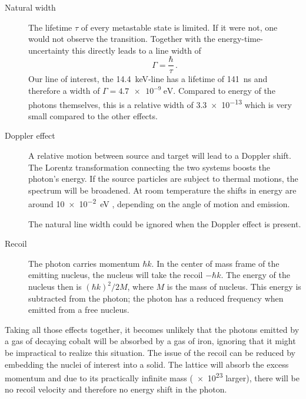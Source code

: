 \documentclass[11pt, english, fleqn, DIV=15, headinclude, BCOR=2cm]{scrreprt}
\begin{document}
\begin{description}
    \item[Natural width]
        The lifetime $\tau$ of every metastable state is limited. If it were
        not, one would not observe the transition. Together with the
        energy-time-uncertainty this directly leads to a line width of
        \[
            \Gamma = \frac\hbar\tau \,.
        \]
        Our line of interest, the \SI{14.4}{\kilo\electronvolt}-line has a
        lifetime of \SI{141}{\nano\second} and therefore a width of $\Gamma =
        \SI{4.7e-9}{\electronvolt}$. Compared to energy of the photons
        themselves, this is a relative width of \num{3.3e-13} which is very
        small compared to the other effects.
        \parencite[42]{Schatz/Nukleare_Festkoerperphysik}

    \item[Doppler effect]
        A relative motion between source and target will lead to a Doppler
        shift. The Lorentz transformation connecting the two systems boosts the
        photon's energy. If the source particles are subject to thermal
        motions, the spectrum will be broadened. At room temperature the shifts
        in energy are around \SI{10e-2}{\electronvolt}
        \parencite[43]{Schatz/Nukleare_Festkoerperphysik}, depending on the
        angle of motion and emission.

        The natural line width could be ignored when the Doppler effect is
        present.

    \item[Recoil]
        The photon carries momentum $\hbar k$. In the center of mass frame of
        the emitting nucleus, the nucleus will take the recoil $- \hbar k$. The
        energy of the nucleus then is $(\hbar k)^2/2 M$, where $M$ is the mass
        of nucleus. This energy is subtracted from the photon; the photon has a
        reduced frequency when emitted from a free nucleus.
\end{description}

Taking all those effects together, it becomes unlikely that the photons emitted
by a gas of decaying cobalt will be absorbed by a gas of iron, ignoring that it
might be impractical to realize this situation. The issue of the recoil can be
reduced by embedding the nuclei of interest into a solid. The lattice will
absorb the excess momentum and due to its practically infinite mass (\num{e23}
larger), there will be no recoil velocity and therefore no energy shift in the
photon.
\end{document}
